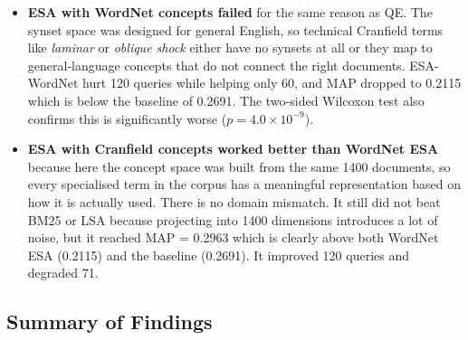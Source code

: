 \documentclass{svproc}
\begin{document}
\begin{itemize}
    \item \textbf{ESA with WordNet concepts failed} for the same reason as QE. The synset space was designed for general English, so technical Cranfield terms like \textit{laminar} or \textit{oblique shock} either have no synsets at all or they map to general-language concepts that do not connect the right documents. ESA-WordNet hurt 120 queries while helping only 60, and MAP dropped to 0.2115 which is below the baseline of 0.2691. The two-sided Wilcoxon test also confirms this is significantly worse ($p = 4.0 \times 10^{-9}$).

    \item \textbf{ESA with Cranfield concepts worked better than WordNet ESA} because here the concept space was built from the same 1400 documents, so every specialised term in the corpus has a meaningful representation based on how it is actually used. There is no domain mismatch. It still did not beat BM25 or LSA because projecting into 1400 dimensions introduces a lot of noise, but it reached MAP = 0.2963 which is clearly above both WordNet ESA (0.2115) and the baseline (0.2691). It improved 120 queries and degraded 71.

    \end{itemize}

    \subsection{Summary of Findings}
\end{document}
